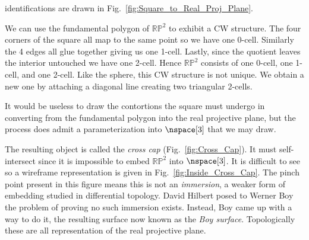     identifications are drawn in
    Fig.~\ref{fig:Square_to_Real_Proj_Plane}. 
    \par\vspace{2.5ex}
    \hfill
    \begin{minipage}[t]{0.54\textwidth}
        \begin{example}
            We can use the fundamental polygon of $\mathbb{RP}^{2}$ to
            exhibit a CW structure. The four corners of the square all
            map to the same point so we have one 0-cell. Similarly the
            4 edges all glue together giving us one 1-cell. Lastly,
            since the quotient leaves the interior untouched we have
            one 2-cell. Hence $\mathbb{RP}^{2}$ consists of one 0-cell,
            one 1-cell, and one 2-cell. Like the sphere, this CW
            structure is not unique. We obtain a new one by attaching
            a diagonal line creating two triangular 2-cells.
        \end{example}
    \end{minipage}
    \par\vspace{2.5ex}
    It would be useless to draw the contortions the square
    must undergo in converting from the fundamental polygon into
    the real projective plane, but the process does admit a
    parameterization into $\nspace[3]$ that we may draw.
    \par\hfill\par
    \begin{minipage}[t]{0.54\textwidth}
        The resulting object is called the \textit{cross cap}
        (Fig.~\ref{fig:Cross_Cap}). It must self-intersect since it is
        impossible to embed $\mathbb{RP}^{2}$ into $\nspace[3]$. It
        is difficult to see so a wireframe representation is given in
        Fig.~\ref{fig:Inside_Cross_Cap}. The pinch point present in this
        figure means this is not an \textit{immersion}, a weaker form of
        embedding studied in differential topology. David Hilbert
        posed to Werner Boy the problem of proving no such
        immersion exists. Instead, Boy came up with a way to do it, the
        resulting surface now known as the \textit{Boy surface}.
        Topologically these are all representation of the real
        projective plane.
    \end{minipage}
